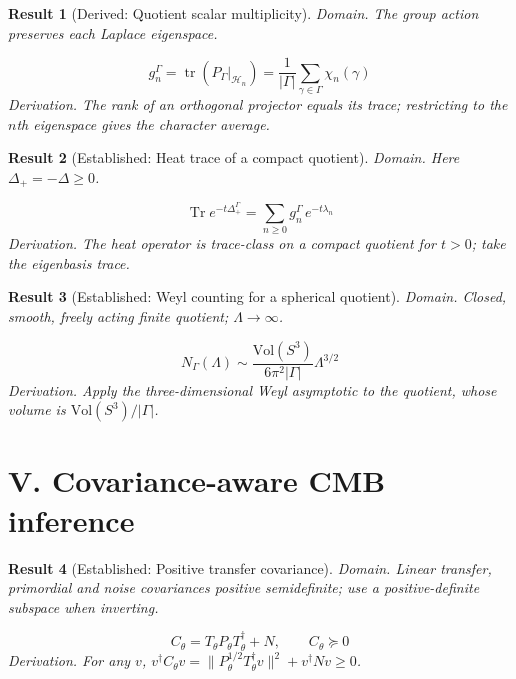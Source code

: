 \documentclass[aps,prd,onecolumn,notitlepage,groupedaddress,11pt]{revtex4-2}
\newtheorem{result}{Result}
\begin{document}
\begin{result}[\textsf{Derived}: Quotient scalar multiplicity]\label{res:22}
\textit{Domain.} The group action preserves each Laplace eigenspace.\par
\begin{equation}\label{eq:22}
g_n^{\Gamma}=\operatorname{tr}(P_{\Gamma}|_{\mathcal H_n})=\frac1{|\Gamma|}\sum_{\gamma\in\Gamma}\chi_n(\gamma)
\end{equation}
\textit{Derivation.} The rank of an orthogonal projector equals its trace; restricting to the $n$th eigenspace gives the character average.
\end{result}

\begin{result}[\textsf{Established}: Heat trace of a compact quotient]\label{res:23}
\textit{Domain.} Here $\Delta_+=-\Delta\ge0$.\par
\begin{equation}\label{eq:23}
\operatorname{Tr}e^{-t\Delta_{+}^{\Gamma}}=\sum_{n\ge0}g_n^{\Gamma}\,e^{-t\lambda_n}
\end{equation}
\textit{Derivation.} The heat operator is trace-class on a compact quotient for $t>0$; take the eigenbasis trace.
\end{result}

\begin{result}[\textsf{Established}: Weyl counting for a spherical quotient]\label{res:24}
\textit{Domain.} Closed, smooth, freely acting finite quotient; $\Lambda\to\infty$.\par
\begin{equation}\label{eq:24}
N_{\Gamma}(\Lambda)\sim\frac{\mathrm{Vol}(S^3)}{6\pi^2|\Gamma|}\Lambda^{3/2}
\end{equation}
\textit{Derivation.} Apply the three-dimensional Weyl asymptotic to the quotient, whose volume is $\mathrm{Vol}(S^3)/|\Gamma|$.
\end{result}

\section{V. Covariance-aware CMB inference}

\begin{result}[\textsf{Established}: Positive transfer covariance]\label{res:25}
\textit{Domain.} Linear transfer, primordial and noise covariances positive semidefinite; use a positive-definite subspace when inverting.\par
\begin{equation}\label{eq:25}
C_\theta=T_\theta P_\theta T_\theta^\dagger+N,\qquad C_\theta\succeq0
\end{equation}
\textit{Derivation.} For any $v$, $v^\dagger C_\theta v=\|P_\theta^{1/2}T_\theta^\dagger v\|^2+v^\dagger Nv\ge0$.
\end{result}
\end{document}

